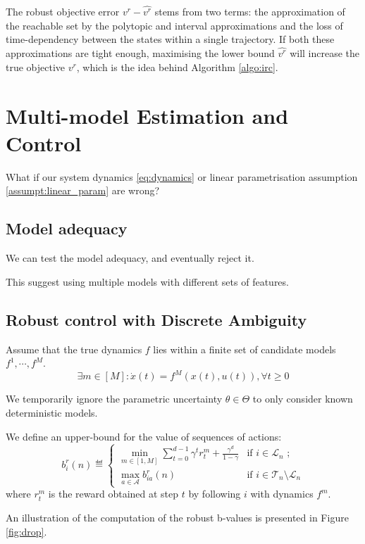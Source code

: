 \documentclass{article}
\begin{document}
The robust objective error $v^r - \hat{v^r}$ stems from two terms: the approximation of the reachable set by the polytopic and interval approximations and the loss of time-dependency between the states within a single trajectory. If both these approximations are tight enough, maximising the lower bound $\hat{v^r}$ will increase the true objective $v^r$, which is the idea behind Algorithm \ref{algo:irc}.

\section{Multi-model Estimation and Control}

What if our system dynamics \eqref{eq:dynamics} or linear parametrisation assumption \ref{assumpt:linear_param} are wrong?

\subsection{Model adequacy}

We can test the model adequacy, and eventually reject it.

This suggest using multiple models with different sets of features.

\subsection{Robust control with Discrete Ambiguity}


\begin{assumption}
Assume that the true dynamics $f$ lies within a finite set of candidate models $f^1, \cdots, f^M$.
\begin{equation}
\exists m\in[M]: \dot{x}(t) = f^M(x(t), u(t)), \forall t\geq 0
\end{equation}

We temporarily ignore the parametric uncertainty $\theta\in\Theta$ to only consider known deterministic models.
\end{assumption}

\begin{definition} We define an upper-bound for the value of sequences of actions:
\begin{equation}
\label{eq:robust_sequence_ucb}
b_i^r(n)  \eqdef
\begin{cases}
\min_{m\in[1, M]} \sum_{t=0}^{d-1} \gamma^t r_t^m  + \frac{\gamma^d}{1-\gamma} &\text{if } i \in \mathcal{L}_n \text{ ;}\\
\max_{a\in\mathcal{A}} b_{ia}^r(n) & \text{if } i \in \mathcal{T}_n \setminus \mathcal{L}_n 
\end{cases}
\end{equation}
where $r_t^m$ is the reward obtained at step $t$ by following $i$ with dynamics $f^m$.
\end{definition}
An illustration of the computation of the robust b-values is presented in Figure \ref{fig:drop}.
\end{document}
